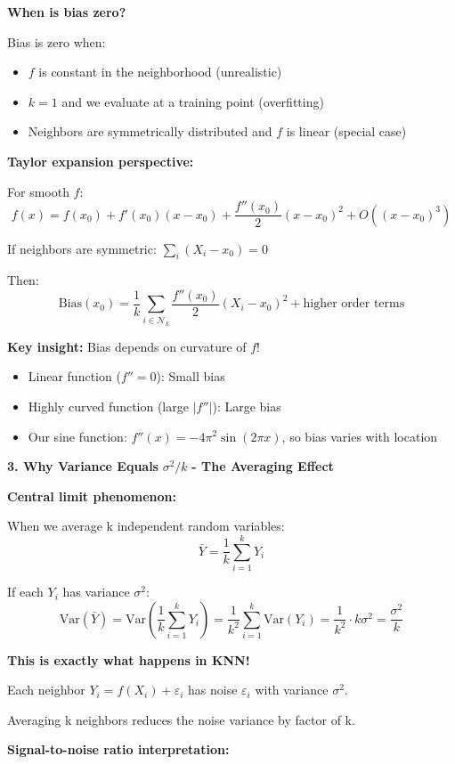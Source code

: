 \documentclass[12pt]{article}
\begin{document}
\begin{explanation}
\textbf{When is bias zero?}

Bias is zero when:
\begin{itemize}
    \item $f$ is constant in the neighborhood (unrealistic)
    \item $k = 1$ and we evaluate at a training point (overfitting)
    \item Neighbors are symmetrically distributed and $f$ is linear (special case)
\end{itemize}

\textbf{Taylor expansion perspective:}

For smooth $f$:
\[
f(x) = f(x_0) + f'(x_0)(x - x_0) + \frac{f''(x_0)}{2}(x - x_0)^2 + O((x-x_0)^3)
\]

If neighbors are symmetric: $\sum_{i}(X_i - x_0) = 0$

Then:
\[
\text{Bias}(x_0) = \frac{1}{k}\sum_{i \in \mathcal{N}_k} \frac{f''(x_0)}{2}(X_i - x_0)^2 + \text{higher order terms}
\]

\textbf{Key insight:} Bias depends on curvature of $f$!

\begin{itemize}
    \item Linear function ($f'' = 0$): Small bias
    \item Highly curved function (large $|f''|$): Large bias
    \item Our sine function: $f''(x) = -4\pi^2\sin(2\pi x)$, so bias varies with location
\end{itemize}

\textbf{3. Why Variance Equals } $\sigma^2/k$ \textbf{ - The Averaging Effect}

\textbf{Central limit phenomenon:}

When we average k independent random variables:
\[
\bar{Y} = \frac{1}{k}\sum_{i=1}^k Y_i
\]

If each $Y_i$ has variance $\sigma^2$:
\[
\text{Var}(\bar{Y}) = \text{Var}\left(\frac{1}{k}\sum_{i=1}^k Y_i\right) = \frac{1}{k^2}\sum_{i=1}^k \text{Var}(Y_i) = \frac{1}{k^2} \cdot k\sigma^2 = \frac{\sigma^2}{k}
\]

\textbf{This is exactly what happens in KNN!}

Each neighbor $Y_i = f(X_i) + \varepsilon_i$ has noise $\varepsilon_i$ with variance $\sigma^2$.

Averaging k neighbors reduces the noise variance by factor of k.

\textbf{Signal-to-noise ratio interpretation:}


\end{explanation}
\end{document}

